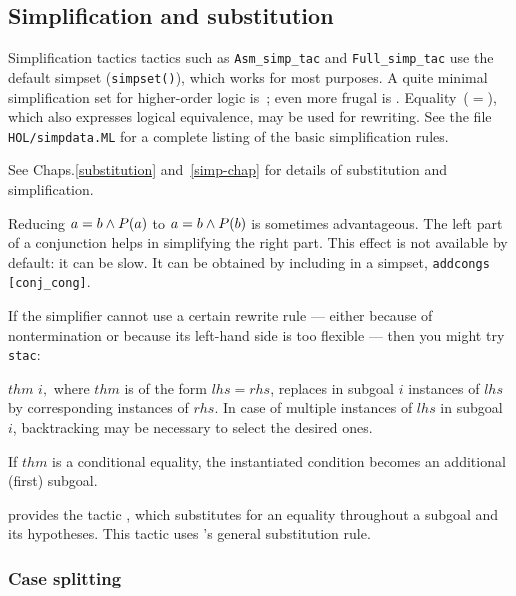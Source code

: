 \subsection{Simplification and substitution}

Simplification tactics tactics such as \texttt{Asm_simp_tac} and \texttt{Full_simp_tac} use the default simpset
(\texttt{simpset()}), which works for most purposes.  A quite minimal
simplification set for higher-order logic is~;
even more frugal is .  Equality~($=$), which
also expresses logical equivalence, may be used for rewriting.  See
the file \texttt{HOL/simpdata.ML} for a complete listing of the basic
simplification rules.

See %
{Chaps.\ts\ref{substitution} and~\ref{simp-chap}} for details of substitution
and simplification.

\begin{warn}%
  Reducing $a=b\wedge P(a)$ to $a=b\wedge P(b)$ is sometimes advantageous.  The
  left part of a conjunction helps in simplifying the right part.  This effect
  is not available by default: it can be slow.  It can be obtained by
  including  in a simpset, \verb$addcongs [conj_cong]$.
\end{warn}

If the simplifier cannot use a certain rewrite rule --- either because
of nontermination or because its left-hand side is too flexible ---
then you might try \texttt{stac}:
\begin{ttdescription}
\item[\ttindexbold{stac} $thm$ $i,$] where $thm$ is of the form $lhs = rhs$,
  replaces in subgoal $i$ instances of $lhs$ by corresponding instances of
  $rhs$.  In case of multiple instances of $lhs$ in subgoal $i$, backtracking
  may be necessary to select the desired ones.

If $thm$ is a conditional equality, the instantiated condition becomes an
additional (first) subgoal.
\end{ttdescription}

 \HOL{} provides the tactic , which substitutes
  for an equality throughout a subgoal and its hypotheses.  This tactic uses
  \HOL's general substitution rule.

\subsubsection{Case splitting}
\label{subsec:HOL:case:splitting}

